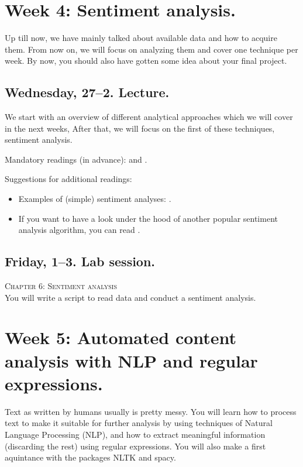 \section*{Week 4: Sentiment analysis.}
Up till now, we have mainly talked about available data and how to acquire them. From now on, we will focus on analyzing them and cover one technique per week. By now, you should also have gotten some idea about your final project.


\subsection*{Wednesday, 27--2. Lecture.}
We start with an overview of different analytical approaches which we will cover in the next weeks, After that, we will focus on the first of these techniques, sentiment analysis.

Mandatory readings (in advance): \cite{GonzalezBailon2015} and \cite{Hutto2014}.

Suggestions for additional readings:
\begin{itemize}
	\item Examples of (simple) sentiment analyses: \cite{Huang2007,Pestian2012, Mostafa2013}. 
	\item If you want to have a look under the hood of another popular sentiment analysis algorithm, you can read \cite{Thelwall2012}.
\end{itemize}




\subsection*{Friday, 1--3. Lab session.}
\textsc{ Chapter 6: Sentiment analysis}\\
You will write a script to read data and conduct a sentiment analysis.






\section*{Week 5: Automated content analysis with NLP and regular expressions.}
Text as written by humans usually is pretty messy. You will learn how to process text to make it suitable for further analysis by using techniques of Natural Language Processing (NLP), and how to extract meaningful information (discarding the rest) using regular expressions. You will also make a first aquintance with the packages NLTK and spacy.




